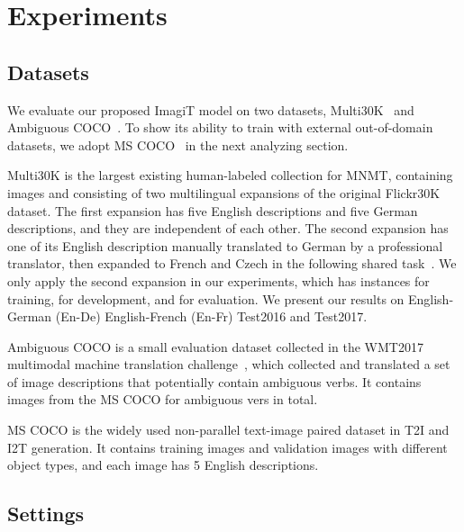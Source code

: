 \documentclass[11pt]{article}
\newcommand{\method}{ImagiT\xspace}
\begin{document}
\section{Experiments}
\label{sec:exp}
\subsection{Datasets}

We evaluate our proposed \method model on two datasets, Multi30K~\cite{elliott2016multi30k} and Ambiguous COCO~\cite{elliott2017findings}. To show its ability to train with external out-of-domain datasets, we adopt MS COCO~\cite{lin2014microsoft} in the next analyzing section.

Multi30K is the largest existing human-labeled collection for MNMT, containing  images and consisting of two multilingual expansions of the original Flickr30K\cite{young2014image} dataset. The first expansion has five English descriptions and five German descriptions, and they are independent of each other. The second expansion has one of its English description manually translated to German by a professional translator, then expanded to French and Czech in the following shared task~\cite{elliott2017findings,barrault2018findings}. We only apply the second expansion in our experiments, which has  instances for training,  for development, and  for evaluation. We present our results on English-German (En-De) English-French (En-Fr) Test2016 and Test2017.

Ambiguous COCO is a small evaluation dataset collected in the WMT2017 multimodal machine translation challenge~\cite{elliott2017findings}, which collected and translated a set of image descriptions that potentially contain ambiguous verbs. It contains  images from the MS COCO\cite{lin2014microsoft} for  ambiguous vers in total. 

MS COCO is the widely used non-parallel text-image paired dataset in T2I and I2T generation. It contains  training images and  validation images with  different object types, and each image has 5 English descriptions.

\subsection{Settings}
\end{document}
